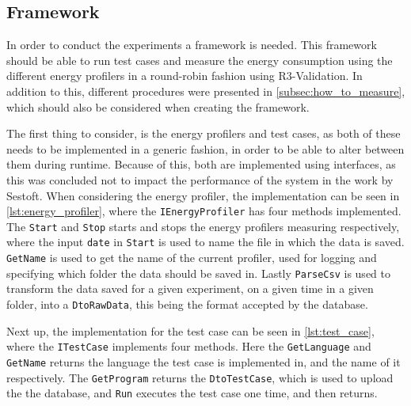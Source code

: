 \subsection{Framework}

In order to conduct the experiments a framework is needed. This framework should be able to run test cases and measure the energy consumption using the different energy profilers in a round-robin fashion using R3-Validation. In addition to this, different procedures were presented in \cref{subsec:how_to_measure}, which should also be considered when creating the framework.


The first thing to consider, is the energy profilers and test cases, as both of these needs to be implemented in a generic fashion, in order to be able to alter between them during runtime. Because of this, both are implemented using interfaces, as this was concluded not to impact the performance of the system in the work by Sestoft\cite[]{sestoft2013microbenchmarks}. When considering the energy profiler, the implementation can be seen in \cref{lst:energy_profiler}, where the \texttt{IEnergyProfiler} has four methods implemented. The \texttt{Start} and \texttt{Stop} starts and stops the energy profilers measuring respectively, where the input \texttt{date} in \texttt{Start} is used to name the file in which the data is saved. \texttt{GetName} is used to get the name of the current profiler, used for logging and specifying which folder the data should be saved in. Lastly \texttt{ParseCsv} is used to transform the data saved for a given experiment, on a given time in a given folder, into a \texttt{DtoRawData}, this being the format accepted by the database.



Next up, the implementation for the test case can be seen in \cref*{lst:test_case}, where the \texttt{ITestCase} implements four methods. Here the \texttt{GetLanguage} and \texttt{GetName} returns the language the test case is implemented in, and the name of it respectively. The \texttt{GetProgram} returns the \texttt{DtoTestCase}, which is used to upload the the database, and \texttt{Run} executes the test case one time, and then returns.



